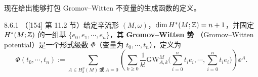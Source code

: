 现在给出能够打包 Gromov--Witten 不变量的生成函数的定义。

\begin{wdefn}{8.6.1}
（[154] 第 11.2 节）给定辛流形 $(M,\omega)$，$\dim H^*(M;\mathbb{Z})=n+1$，并固定
$H^*(M;\mathbb{Z})$ 的一组基 $\{e_0,e_1,\cdots,e_n\}$，其 \textbf{Gromov--Witten 势}
（Gromov–Witten potential）是一个形式级数 $\Phi$（变量为 $t_0,\cdots,t_n$），定义为
\begin{equation}
  \Phi(t_0,\cdots,t_n)
  :=\sum_{A\in H_2^S(M)\ \text{或}\ A=0}
  \left(\sum_{k\ge0}\frac{1}{k!}\mathrm{GW}^M_{A,k}
  \Big(\sum_{i=0}^nt_ie_i,\cdots,\sum_{i=0}^nt_ie_i\Big)\right)\ee^A .
  \tag{8.47}
\end{equation}
\end{wdefn}


